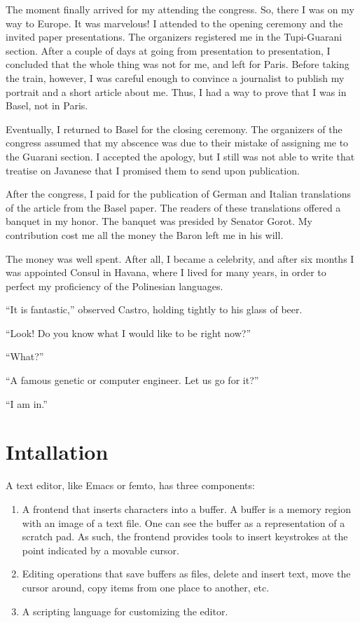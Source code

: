 \documentclass[a4paper,12pt]{book}
\begin{document}
The moment finally arrived for my
attending the congress. So, there
I was on my way to Europe.
It was marvelous! I attended to
the opening ceremony and the invited
paper presentations. The organizers
registered me in the Tupi-Guarani
section. After a couple of days at
going from presentation to presentation,
I concluded that the whole thing was
not for me, and left for Paris.
Before taking the train, however,
I was careful enough to convince a
journalist to publish my portrait
and a short article about me. Thus,
I had a way to prove that I was in
Basel, not in Paris.

Eventually, I returned to Basel for
the closing ceremony. The organizers
of the congress assumed that my
abscence was due to their mistake
of assigning me to the Guarani section.
I accepted the apology, but I still
was not able to write that treatise
on Javanese that I promised them
to send upon publication.

After the congress, I paid for the publication
of German and Italian translations of the article
from the Basel paper. The readers of these
translations offered a banquet in my honor.
The banquet was presided by Senator Gorot.
My contribution cost me all the money
the Baron left me in his will.

The money was well spent. After all,
I became a celebrity, and after six
months I was appointed Consul in
Havana, where I lived for many years,
in order to perfect my proficiency
of the Polinesian languages.

``It is fantastic,'' observed Castro, holding
tightly to his glass of beer.

``Look! Do you know what I would like to
be right now?''

``What?''

``A famous genetic or computer engineer. Let us
go for it?''

``I am in.''


\chapter{Intallation}  
A text editor, like Emacs or femto, has three components:
\begin{enumerate}
  \item A frontend that inserts characters into a buffer.
    A buffer is a memory region with an image of a
    text file. One can see the buffer as a representation
    of a scratch pad. As such, the frontend provides tools to
  insert keystrokes at the  point indicated by 
  a movable cursor.
\item Editing operations that save buffers
  as files, delete and insert text, move the
  cursor around, copy items from one place to another, etc.
\item A scripting language for customizing the editor.
\end{enumerate}
\end{document}
